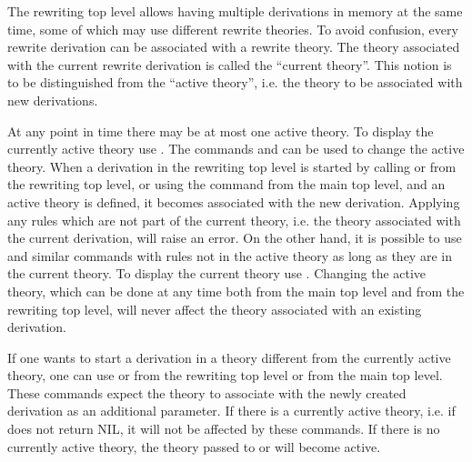 The rewriting top level allows having multiple derivations in memory at the
same time, some of which may use different rewrite theories. To avoid
confusion, every rewrite derivation can be associated with a rewrite theory.
The theory associated with the current rewrite derivation is called the
``current theory''. This notion is to be distinguished from the ``active
theory'', i.e. the theory to be associated with new derivations.

At any point in time there may be at most one active theory. To display
the currently active theory use . The commands
 and  can be used
to change the active theory.
When a derivation in the rewriting top level is started by calling
 or  from the rewriting top level, or
using the  command from the main top level, and an
active theory is defined, it
becomes associated with the new derivation. Applying any rules which are
not part of the current theory, i.e. the theory associated with the current
derivation, will raise an error. On the other hand, it is possible to use
 and similar commands with rules not in the active theory as
long as they are in the current theory.
To display the current theory use .
Changing the active theory, which can be done at any time both from the main
top level and from the rewriting top level, %
will never affect the theory associated with an existing derivation.

If one wants to start a derivation in a theory different from the currently
active theory, one can use  or 
from the rewriting top level or  from the main top
level. These commands expect the theory to associate with the newly created
derivation as an additional parameter. If there is a currently active theory,
i.e. if  does not return NIL, it will not be
affected by these commands. If there is no currently active theory, the theory
passed to  or  will become
active.


